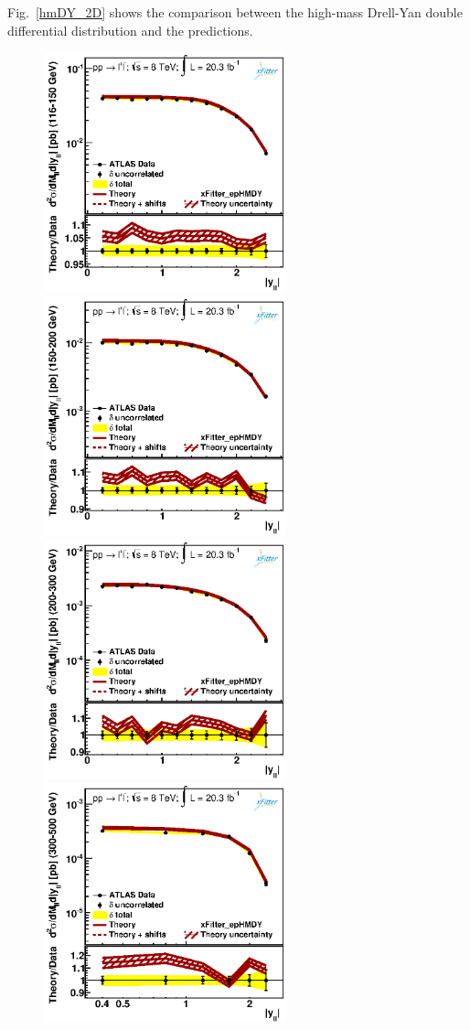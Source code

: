 Fig.~\ref{hmDY_2D} 
shows the comparison between the high-mass Drell-Yan double differential distribution and 
the predictions.
\begin{figure}
\centering
\includegraphics[width=7cm]{data_1.ps} 
\includegraphics[width=7cm]{data_2.ps} 
\includegraphics[width=7cm]{data_3.ps} 
\includegraphics[width=7cm]{data_4.ps} 

\end{figure}
